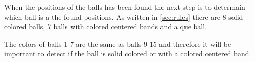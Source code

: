 When the positions of the balls has been found the next step is to determain which ball is a the found positions. As written in \ref{sec:rules} there are 8 solid colored balls, 7 balls with colored centered bands and a que ball.

The colors of balls 1-7 are the same as balls 9-15 and therefore it will be important to detect if the ball is solid colored or with a colored centered band.